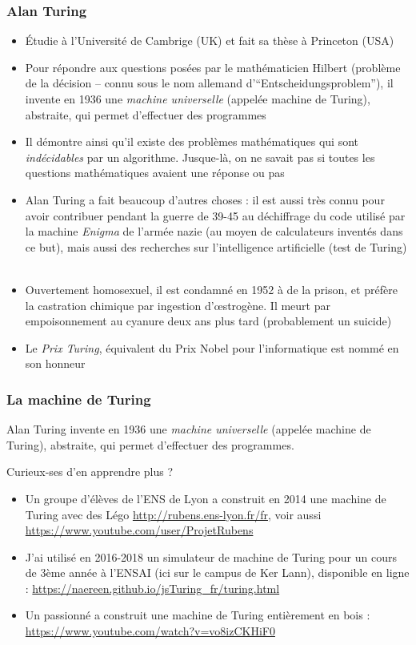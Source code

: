 \documentclass{beamer}
\newcommand{\mypause}{~}
\begin{document}
\frame
{
\frametitle{Alan Turing}
{\footnotesize
\begin{itemize}
  \item Étudie à l'Université de Cambrige (UK) et fait sa thèse à Princeton (USA)
  \mypause{}
  \item Pour répondre aux questions posées par le mathématicien Hilbert (problème de la décision -- connu sous le nom allemand d'``Entscheidungsproblem''), il invente en 1936 une {\em machine universelle} (appelée machine de Turing), abstraite, qui permet d'effectuer des programmes
  \mypause{}
  \item Il démontre ainsi qu'il existe des problèmes mathématiques qui sont {\em indécidables} par un algorithme. Jusque-là, on ne savait pas si toutes les questions mathématiques avaient une réponse ou pas
  \mypause{}
  \item Alan Turing a fait beaucoup d'autres choses : il est aussi très connu pour avoir contribuer pendant la guerre de 39-45 au déchiffrage du code utilisé par la machine \emph{Enigma} de l'armée nazie (au moyen de calculateurs inventés dans ce but), mais aussi des recherches sur l'intelligence artificielle (test de Turing)
  \mypause{}
  \item Ouvertement homosexuel, il est condamné en 1952 à de la prison, et préfère la castration chimique par ingestion d'{\oe}strogène. Il meurt par empoisonnement au cyanure deux ans plus tard (probablement un suicide)
  \mypause{}
  \item Le \emph{Prix Turing}, équivalent du Prix Nobel pour l'informatique est nommé en son honneur
\end{itemize}
}
}

\frame
{
\frametitle{La machine de Turing}
Alan Turing invente en 1936 une {\em machine universelle} (appelée machine de Turing), abstraite, qui permet d'effectuer des programmes. \mypause{}

\begin{block}{Curieux-ses d'en apprendre plus ?}
\begin{itemize}
  \item Un groupe d'élèves de l'ENS de Lyon a construit en 2014 une machine de Turing avec des Légo \textcolor{blue}{\url{http://rubens.ens-lyon.fr/fr}}, voir aussi \textcolor{blue}{\url{https://www.youtube.com/user/ProjetRubens}}
  \mypause{}
  \item J'ai utilisé en 2016-2018 un simulateur de machine de Turing pour un cours de 3ème année à l'ENSAI (ici sur le campus de Ker Lann), disponible en ligne : \textcolor{blue}{\url{https://naereen.github.io/jsTuring_fr/turing.html}}
  \mypause{}
  \item Un passionné a construit une machine de Turing entièrement en bois : \textcolor{blue}{\url{https://www.youtube.com/watch?v=vo8izCKHiF0}}
\end{itemize}
\end{block}
}
\end{document}
